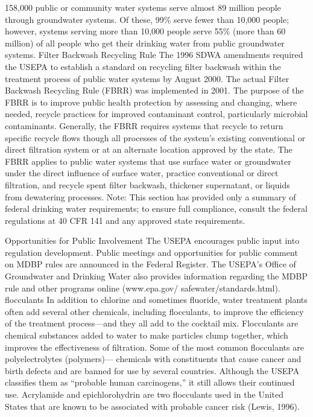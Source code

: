 \documentclass{article}
\begin{document}
158,000 public or community water systems serve almost 89 million people
through groundwater systems. Of these, 99\% serve fewer than 10,000
people; however, systems serving more than 10,000 people serve 55\%
(more than 60 million) of all people who get their drinking water from
public groundwater systems. Filter Backwash Recycling Rule The 1996 SDWA
amendments required the USEPA to establish a standard on recycling
filter backwash within the treatment process of public water systems by
August 2000. The actual Filter Backwash Recycling Rule (FBRR) was
implemented in 2001. The purpose of the FBRR is to improve public health
protection by assessing and changing, where needed, recycle practices
for improved contaminant control, particularly microbial contaminants.
Generally, the FBRR requires systems that recycle to return specific
recycle flows though all processes of the system's existing conventional
or direct filtration system or at an alternate location approved by the
state. The FBRR applies to public water systems that use surface water
or groundwater under the direct influence of surface water, practice
conventional or direct filtration, and recycle spent filter backwash,
thickener supernatant, or liquids from dewatering processes. Note: This
section has provided only a summary of federal drinking water
requirements; to ensure full compliance, consult the federal regulations
at 40 CFR 141 and any approved state requirements.

Opportunities for Public Involvement The USEPA encourages public input
into regulation development. Public meetings and opportunities for
public comment on MDBP rules are announced in the Federal Register. The
USEPA's Office of Groundwater and Drinking Water also provides
information regarding the MDBP rule and other programs online
(www.epa.gov/ safewater/standards.html). flocculants In addition to
chlorine and sometimes fluoride, water treatment plants often add
several other chemicals, including flocculants, to improve the
efficiency of the treatment process---and they all add to the cocktail
mix. Flocculants are chemical substances added to water to make
particles clump together, which improves the effectiveness of
filtration. Some of the most common flocculants are polyelectrolytes
(polymers)--- chemicals with constituents that cause cancer and birth
defects and are banned for use by several countries. Although the USEPA
classifies them as ``probable human carcinogens,'' it still allows their
continued use. Acrylamide and epichlorohydrin are two flocculants used
in the United States that are known to be associated with probable
cancer risk (Lewis, 1996).
\end{document}
